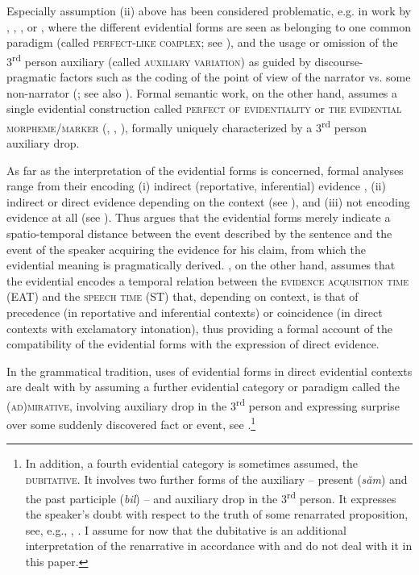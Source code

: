 \documentclass[output=paper]{langscibook}
\begin{document}
Especially assumption (ii) above has been considered problematic, e.g. in work by \citet{Gerdzikov1984}, \citet{Ivancev1988}, \citet{Levin-Steinmann2004}, or \citet{Sonnenhauser2013}, where the different evidential forms are seen as belonging to one common paradigm (called \textsc{perfect-like complex}; see \citealt{Ivancev1988}), and the usage or omission of the 3\textsuperscript{rd} person auxiliary (called \textsc{auxiliary variation}) as guided by discourse-pragmatic factors such as the coding of the point of view of the narrator vs. some non-narrator (\citealt{Sonnenhauser2013}; see also \citealt{Friedman1981,Lindstedt1994,Fielder99}). Formal semantic work, on the other hand, assumes a single evidential construction called \textsc{perfect of evidentiality} \citep{Izvorski1997} or \textsc{the evidential morpheme/marker} (\citealt{Smirnova2011a,Smirnova2011b}, \citeyear{Smirnova2013}, \citealt{Koev2017}), formally uniquely characterized by a 3\textsuperscript{rd} person auxiliary drop.


As far as the interpretation of the evidential forms is concerned, formal analyses range from their encoding (i) indirect (reportative, inferential) evidence \citep[see][]{Izvorski1997}, (ii) indirect or direct evidence depending on the context (see \citeauthor{Smirnova2013}), and (iii) not encoding evidence at all (see \citealt{Koev2017}). Thus \citeauthor{Koev2017} argues that the evidential forms merely indicate a spatio-temporal distance between the event described by the sentence and the event of the speaker acquiring the evidence for his claim, from which the evidential meaning is pragmatically derived. \citeauthor{Smirnova2013}, on the other hand, assumes that the evidential encodes a temporal relation between the \textsc{evidence acquisition time} (EAT) and the \textsc{speech time} (ST) that, depending on context, is that of precedence (in reportative and inferential contexts) or coincidence (in direct contexts with exclamatory intonation), thus providing a formal account of the compatibility of the evidential forms with the expression of direct evidence.

In the grammatical tradition, uses of evidential forms in direct evidential contexts are dealt with by assuming a further evidential category or paradigm \citep[see][]{Stankov1969} called the \textsc{(ad)mirative}, involving auxiliary drop in the 3\textsuperscript{rd} person and expressing surprise over some suddenly discovered fact or event, see .\footnote{In addition, a fourth evidential category is sometimes assumed, the \textsc{dubitative}. It involves two further forms of the auxiliary -- present (\textit{săm}) and the past participle (\textit{bil}) -- and auxiliary drop in the 3\textsuperscript{rd} person. It expresses the speaker's doubt with respect to the truth of some renarrated proposition, see, e.g., \citet{Bojadziev.etal1999}, \citet{Pasov1999}. I assume for now that the dubitative is an additional interpretation of the renarrative in accordance with \citet{Bojadziev.etal1999} and do not deal with it in this paper.}
\end{document}
